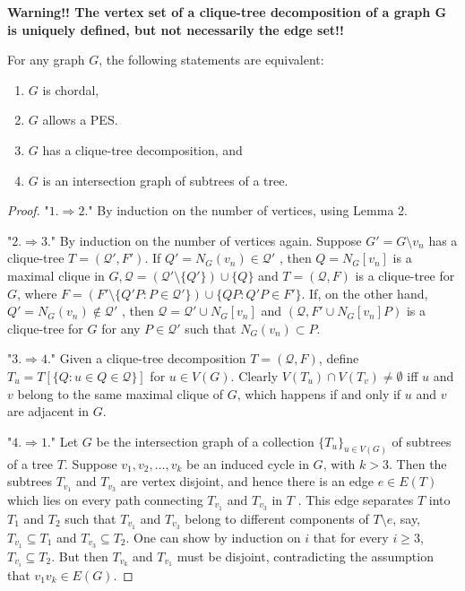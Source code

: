 \textbf{Warning!! The vertex set of a clique-tree decomposition of a graph G is uniquely defined, but not necessarily the edge set!!}

\begin{thm}
	For any graph $G$, the following statements are equivalent:
	
	\begin{enumerate}
		\item $G$ is chordal,
		\item $G$ allows a PES.
		\item $G$ has a clique-tree decomposition, and
		\item $G$ is an intersection graph of subtrees of a tree.
	\end{enumerate}
\end{thm}

\begin{proof}
	"$1. \Rightarrow 2.$" By induction on the number of vertices, using Lemma 2.
	
	"$2. \Rightarrow 3.$" By induction on the number of vertices again. Suppose $G' = G \setminus v_n$ has a clique-tree	$T = (\mathcal{Q}' , F')$. If $Q' = N_G (v_n) \in \mathcal{Q}'$ , then $Q = N_G [v_n]$ is a maximal clique in $G, \mathcal{Q} = (\mathcal{Q}' \setminus \{Q'\}) \cup \{Q\}$ and $T = (\mathcal{Q}, F)$ is a clique-tree for $G$, where $F = (F' \setminus \{Q' P : P \in \mathcal{Q}'\}) \cup \{QP : Q'P \in F'\}$. If, on the other hand, $Q' = N_G(v_n) \notin \mathcal{Q}'$ , then $\mathcal{Q} = \mathcal{Q}' \cup N_G [v_n]$ and $(\mathcal{Q}, F' \cup N_G [v_n]P)$ is a clique-tree for $G$ for any $P \in \mathcal{Q}'$ such that $N_G (v_n) \subset P$.
	
	"$3. \Rightarrow 4.$" Given a clique-tree decomposition $T = (\mathcal{Q}, F)$, define $T_u = T [\{Q : u \in Q \in \mathcal{Q}\}]$ for $u \in V(G)$. Clearly $V(T_u) \cap V(T_v) \neq \emptyset$ iff $u$ and $v$ belong to the same maximal clique of $G$, which happens if and only if $u$ and $v$ are adjacent in $G$.
	
	"$4. \Rightarrow 1.$" Let $G$ be the intersection graph of a collection $\{T_u\}_{u \in V(G)}$ of subtrees of a tree $T$. Suppose $v_1, v_2, \dots, v_k$ be an induced cycle in $G$, with $k > 3$. Then the subtrees $T_{v_1}$ and $T_{v_3}$ are vertex disjoint, and hence there is an edge $e \in E(T)$ which lies on every path connecting $T_{v_1}$ and $T_{v_3}$ in $T$ . This edge separates $T$ into $T_1$ and $T_2$ such that $T_{v_1}$ and $T_{v_3}$ belong to different components of $T \setminus e$, say, $T_{v_1} \subseteq T_1$ and $T_{v_3} \subseteq T_2$. One can show by induction on $i$ that for every $i \geq 3$, $T_{v_i} \subseteq T_2$. But then $T_{v_k}$ and $T_{v_1}$ must be disjoint, contradicting the assumption that $v_1 v_k \in E(G)$.
\end{proof}

